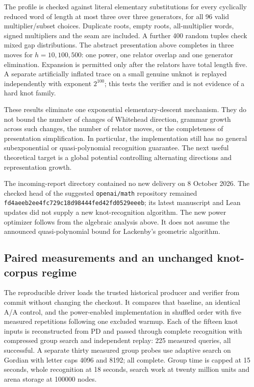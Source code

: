 The profile is checked against literal elementary substitutions for every
cyclically reduced word of length at most three over three generators, for
all 96 valid multiplier/subset choices. Duplicate roots, empty roots,
all-multiplier words, signed multipliers and the seam are included. A further
400 random tuples check mixed gap distributions. The abstract presentation
above completes in three moves for $h=10,100,500$: one power, one relator
overlap and one generator elimination. Expansion is permitted only after
the relators have total length five. A separate artificially inflated trace
on a small genuine unknot is replayed independently with exponent $2^{100}$;
this tests the verifier and is not evidence of a hard knot family.

These results eliminate one exponential elementary-descent mechanism. They
do not bound the number of changes of Whitehead direction, grammar growth
across such changes, the number of relator moves, or the completeness of
presentation simplification. In particular, the implementation still has
no general subexponential or quasi-polynomial recognition guarantee.
The next useful theoretical target is a global potential controlling
alternating directions and representation growth.

The incoming-report directory contained no new delivery on 8 October 2026.
The checked head of the suggested \texttt{openai/math} repository remained
\texttt{fd4aeeb2ee4fc729c18d98444fed42fd0529eeeb}; its latest manuscript and
Lean updates did not supply a new knot-recognition algorithm. The new
power optimizer follows from the algebraic analysis above. It does not
assume the announced quasi-polynomial bound for Lackenby's geometric
algorithm.

\subsection{Paired measurements and an unchanged knot-corpus regime}

The reproducible driver  loads the
trusted historical producer and verifier from commit
 without changing the checkout.
It compares that baseline, an identical A/A control, and the power-enabled
implementation in shuffled order with five measured repetitions following
one excluded warmup. Each of the fifteen knot inputs is reconstructed
from PD and passed through complete recognition with compressed group
search and independent replay: 225 measured queries, all successful.
A separate thirty measured group probes use adaptive search on Gordian
with letter caps 4096 and 8192; all complete. Group time is capped at
15 seconds, whole recognition at 18 seconds, search work at twenty million
units and arena storage at 100000 nodes.

